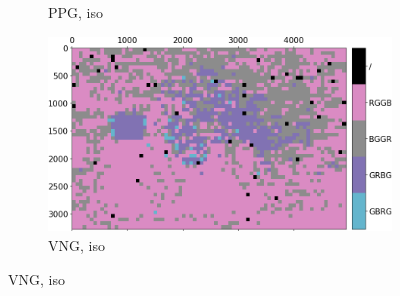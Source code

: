 \documentclass{ipol}
\begin{document}
\begin{figure}[ht]
\begin{subfigure}[c]{.14\linewidth}
\caption{PPG, iso}
\end{subfigure}%
\begin{subfigure}[c]{.14\linewidth}
\includegraphics[width=\linewidth]{images/bike/VNG/iso_64_grids.png}
\caption{VNG, iso}
\end{subfigure}


\end{figure}
\end{document}
